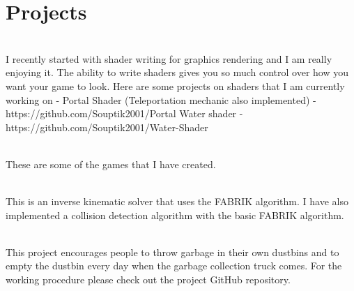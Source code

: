 \documentclass[]{deedy-resume-openfont}
\begin{document}
       \section{Projects}
       \raggedright
         
       
           \hfill {}\\
           I recently started with shader writing for graphics rendering and I am really enjoying it. The ability to write shaders gives you so much control over how you want your game to look. Here are some projects on shaders that I am currently working on - Portal Shader (Teleportation mechanic also implemented) - https://github.com/Souptik2001/Portal
Water shader - https://github.com/Souptik2001/Water-Shader\\
           \sectionsep
           
           
           \hfill {}\\
           These are some of the games that I have created.\\
           \sectionsep
           
           
           
           \hfill {}\\
           This is an inverse kinematic solver that uses the FABRIK algorithm. I have also implemented a collision detection algorithm with the basic FABRIK algorithm.\\
           \sectionsep
         
         
       
           \hfill {}\\
           This project encourages people to throw garbage in their own dustbins and to empty the dustbin every day when the garbage collection truck comes. For the working procedure please check out the project GitHub repository.\\
           \sectionsep
         
\end{document}
